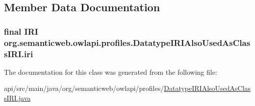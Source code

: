 \subsection{Member Data Documentation}
\hypertarget{classorg_1_1semanticweb_1_1owlapi_1_1profiles_1_1_datatype_i_r_i_also_used_as_class_i_r_i_a7a7060004d85e838a78a4ae0c5ec8e17}{
\subsubsection[{iri}]{\setlength{\rightskip}{0pt plus 5cm}final {\bf I\-R\-I} org.\-semanticweb.\-owlapi.\-profiles.\-Datatype\-I\-R\-I\-Also\-Used\-As\-Class\-I\-R\-I.\-iri\hspace{0.3cm}{\ttfamily [private]}}}\label{classorg_1_1semanticweb_1_1owlapi_1_1profiles_1_1_datatype_i_r_i_also_used_as_class_i_r_i_a7a7060004d85e838a78a4ae0c5ec8e17}


The documentation for this class was generated from the following file\-:\begin{DoxyCompactItemize}
\item 
api/src/main/java/org/semanticweb/owlapi/profiles/\hyperlink{_datatype_i_r_i_also_used_as_class_i_r_i_8java}{Datatype\-I\-R\-I\-Also\-Used\-As\-Class\-I\-R\-I.\-java}\end{DoxyCompactItemize}
